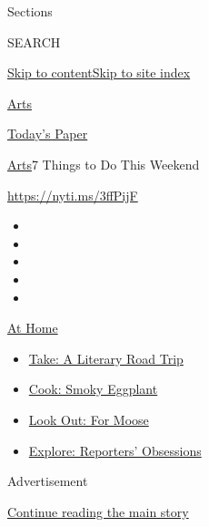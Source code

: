 Sections

SEARCH

\protect\hyperlink{site-content}{Skip to
content}\protect\hyperlink{site-index}{Skip to site index}

\href{https://www.nytimes.com/section/arts}{Arts}

\href{https://myaccount.nytimes.com/auth/login?response_type=cookie\&client_id=vi}{}

\href{https://www.nytimes.com/section/todayspaper}{Today's Paper}

\href{/section/arts}{Arts}\textbar{}7 Things to Do This Weekend

\url{https://nyti.ms/3ffPijF}

\begin{itemize}
\item
\item
\item
\item
\item
\end{itemize}

\href{https://www.nytimes.com/spotlight/at-home?action=click\&pgtype=Article\&state=default\&region=TOP_BANNER\&context=at_home_menu}{At
Home}

\begin{itemize}
\tightlist
\item
  \href{https://www.nytimes.com/2020/07/28/books/time-for-a-literary-road-trip.html?action=click\&pgtype=Article\&state=default\&region=TOP_BANNER\&context=at_home_menu}{Take:
  A Literary Road Trip}
\item
  \href{https://www.nytimes.com/2020/07/29/magazine/bored-with-your-home-cooking-some-smoky-eggplant-will-fix-that.html?action=click\&pgtype=Article\&state=default\&region=TOP_BANNER\&context=at_home_menu}{Cook:
  Smoky Eggplant}
\item
  \href{https://www.nytimes.com/2020/07/27/travel/moose-michigan-isle-royale.html?action=click\&pgtype=Article\&state=default\&region=TOP_BANNER\&context=at_home_menu}{Look
  Out: For Moose}
\item
  \href{https://www.nytimes.com/interactive/2020/at-home/even-more-reporters-editors-diaries-lists-recommendations.html?action=click\&pgtype=Article\&state=default\&region=TOP_BANNER\&context=at_home_menu}{Explore:
  Reporters' Obsessions}
\end{itemize}

Advertisement

\protect\hyperlink{after-top}{Continue reading the main story}


